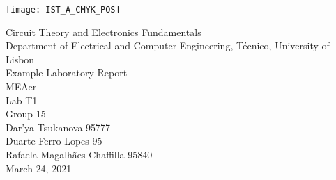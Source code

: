 
\thispagestyle {empty}

\texttt{[image: IST\_A\_CMYK\_POS]}

\begin{center}
%
\vspace{1.0cm}

\vspace{1cm}
{\FontLb Circuit Theory and Electronics Fundamentals} \\ %
\vspace{1cm}
{\FontSn Department of Electrical and Computer Engineering, Técnico, University of Lisbon} \\ %
\vspace{1cm}
{\FontSn Example Laboratory Report} \\
\vspace{1cm}
{\FontSn MEAer} \\ %
\vspace{1cm}
{\FontSn Lab T1} \\
\vspace{1cm}
{\FontSn Group 15} \\
{\FontSn Dar'ya Tsukanova 95777} \\
{\FontSn Duarte Ferro Lopes 95} \\
{\FontSn Rafaela Magalhães Chaffilla 95840} \\
\vspace{1cm}
{\FontSn March 24, 2021} \\ %
%
\end{center}


